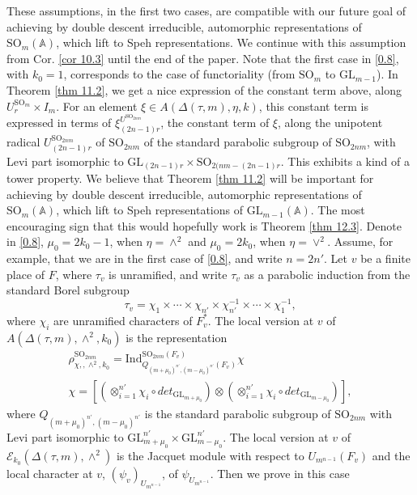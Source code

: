 \documentclass[12pts]{amsart}
\newcommand{\BA}{{\mathbb {A}}}
\newcommand{\GL}{{\mathrm{GL}}}
\newcommand{\Ind}{{\mathrm{Ind}}}
\newcommand{\SO}{{\mathrm{SO}}}
\begin{document}
 These assumptions, in the first two cases, are compatible with our future goal of achieving by double descent irreducible, automorphic representations of $\SO_m(\BA)$, which lift to Speh representations. We continue with this assumption from Cor. \ref{cor 10.3} until the end of the paper. Note that the first case in \eqref{0.8}, with $k_0=1$, corresponds to the case of functoriality (from $\SO_m$ to $\GL_{m-1}$). In Theorem \ref{thm 11.2}, we get a nice expression of the constant term above, along $U_r^{\SO_m}\times I_m$. For an element $\xi\in A(\Delta(\tau,m),\eta, k)$, this constant term is expressed in terms of $\xi^{U^{\SO_{2nm}}}_{(2n-1)r}$, the constant term of $\xi$, along the unipotent radical $U^{\SO_{2nm}}_{(2n-1)r}$ of $\SO_{2nm}$ of the standard parabolic subgroup of $\SO_{2nm}$, with Levi part isomorphic to $\GL_{(2n-1)r}\times \SO_{2(nm-(2n-1)r}$. This exhibits a kind of a tower property. We believe that Theorem \ref{thm 11.2} will be important for achieving by double descent irreducible, automorphic representations of $\SO_m(\BA)$, which lift to Speh representations of $\GL_{m-1}(\BA)$. The most encouraging sign that this would hopefully work is Theorem \ref{thm 12.3}.
 Denote in \eqref{0.8}, $\mu_0=2k_0-1$, when $\eta=\wedge^2$ and $\mu_0=2k_0$, when $\eta=\vee^2$. Assume, for example, that we are in the first case of \eqref{0.8}, and write $n=2n'$. Let $v$ be a finite place of $F$, where $\tau_v$ is unramified, and write $\tau_v$ as a parabolic induction from the standard Borel subgroup
 $$
 \tau_v=\chi_1\times\cdots\times \chi_{n'}\times \chi^{-1}_{n'}\times\cdots\times\chi^{-1}_1,
 $$
 where $\chi_i$ are unramified characters of $F_v^*$. The local version at $v$ of
 $A(\Delta(\tau,m),\wedge^2,k_0)$ is the representation 
 \begin{multline}\nonumber
 \rho^{\SO_{2nm}}_{\chi,,\wedge^2,k_0}=
 \Ind^{\SO_{2nm}(F_v)}_{Q_{(m+\mu_0)^{n'},(m-\mu_0)^{n'}}(F_v)}\chi\\
 \chi=[(\otimes_{i=1}^{n'}\chi_i\circ det_{\GL_{m+\mu_0}}) \otimes  (\otimes_{i=1}^{n'}\chi_i\circ det_{\GL_{m-\mu_0}})],
 \end{multline}
where $Q_{(m+\mu_0)^{n'},(m-\mu_0)^{n'}}$ is the standard parabolic subgroup of $\SO_{2nm}$ with Levi part isomorphic to $\GL_{m+\mu_0}^{n'}\times \GL_{m-\mu_0}^{n'}$. The local version at $v$ of $\mathcal{E}_{k_0}(\Delta(\tau,m),\wedge^2)$ is the Jacquet module with respect to $U_{m^{n-1}}(F_v)$ and the local character at $v$, $(\psi_v)_{U_{m^{n-1}}}$, of $\psi_{U_{m^{n-1}}}$. Then we prove in this case
\end{document}
